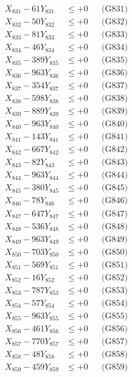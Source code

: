 \documentclass[a4paper,10pt]{article}
\begin{document}
{\begin{align}
\allowbreak
X_{831} - 61Y_{831} &\leq +0 && \text{(G831)} \\
X_{832} - 50Y_{832} &\leq +0 && \text{(G832)} \\
X_{833} - 81Y_{833} &\leq +0 && \text{(G833)} \\
X_{834} - 46Y_{834} &\leq +0 && \text{(G834)} \\
X_{835} - 389Y_{835} &\leq +0 && \text{(G835)} \\
X_{836} - 963Y_{836} &\leq +0 && \text{(G836)} \\
X_{837} - 354Y_{837} &\leq +0 && \text{(G837)} \\
X_{838} - 598Y_{838} &\leq +0 && \text{(G838)} \\
X_{839} - 889Y_{839} &\leq +0 && \text{(G839)} \\
X_{840} - 963Y_{840} &\leq +0 && \text{(G840)} \\
\allowbreak
X_{841} - 143Y_{841} &\leq +0 && \text{(G841)} \\
X_{842} - 667Y_{842} &\leq +0 && \text{(G842)} \\
X_{843} - 82Y_{843} &\leq +0 && \text{(G843)} \\
X_{844} - 963Y_{844} &\leq +0 && \text{(G844)} \\
X_{845} - 380Y_{845} &\leq +0 && \text{(G845)} \\
X_{846} - 78Y_{846} &\leq +0 && \text{(G846)} \\
X_{847} - 647Y_{847} &\leq +0 && \text{(G847)} \\
X_{848} - 536Y_{848} &\leq +0 && \text{(G848)} \\
X_{849} - 963Y_{849} &\leq +0 && \text{(G849)} \\
X_{850} - 703Y_{850} &\leq +0 && \text{(G850)} \\
\allowbreak
X_{851} - 569Y_{851} &\leq +0 && \text{(G851)} \\
X_{852} - 16Y_{852} &\leq +0 && \text{(G852)} \\
X_{853} - 787Y_{853} &\leq +0 && \text{(G853)} \\
X_{854} - 57Y_{854} &\leq +0 && \text{(G854)} \\
X_{855} - 963Y_{855} &\leq +0 && \text{(G855)} \\
X_{856} - 461Y_{856} &\leq +0 && \text{(G856)} \\
X_{857} - 770Y_{857} &\leq +0 && \text{(G857)} \\
X_{858} - 48Y_{858} &\leq +0 && \text{(G858)} \\
X_{859} - 459Y_{859} &\leq +0 && \text{(G859)} \\

\end{align}}
\end{document}
